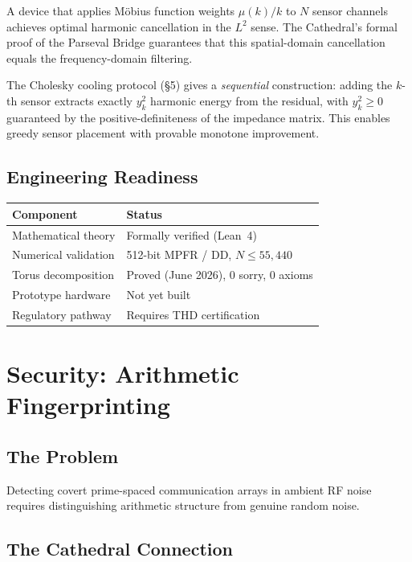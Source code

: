 \documentclass[11pt,a4paper]{article}
\begin{document}
A device that applies M\"obius function weights $\mu(k)/k$ to
$N$ sensor channels achieves optimal harmonic cancellation in the
$L^2$ sense. The Cathedral's formal proof of the Parseval Bridge
guarantees that this spatial-domain cancellation equals the
frequency-domain filtering.

The Cholesky cooling protocol (\S5) gives a \emph{sequential}
construction: adding the $k$-th sensor extracts exactly
$y^2_k$ harmonic energy from the residual, with $y^2_k \geq 0$
guaranteed by the positive-definiteness of the impedance matrix.
This enables greedy sensor placement with provable monotone
improvement.

\subsection{Engineering Readiness}

\begin{center}
\begin{tabular}{@{}ll@{}}
\toprule
\textbf{Component} & \textbf{Status} \\
\midrule
Mathematical theory & Formally verified (Lean~4) \\
Numerical validation & 512-bit MPFR / DD, $N \leq 55{,}440$ \\
Torus decomposition & Proved (June 2026), 0 sorry, 0 axioms \\
Prototype hardware & Not yet built \\
Regulatory pathway & Requires THD certification \\
\bottomrule
\end{tabular}
\end{center}

\section{Security: Arithmetic Fingerprinting}

\subsection{The Problem}

Detecting covert prime-spaced communication arrays in ambient RF
noise requires distinguishing arithmetic structure from genuine
random noise.

\subsection{The Cathedral Connection}
\end{document}
